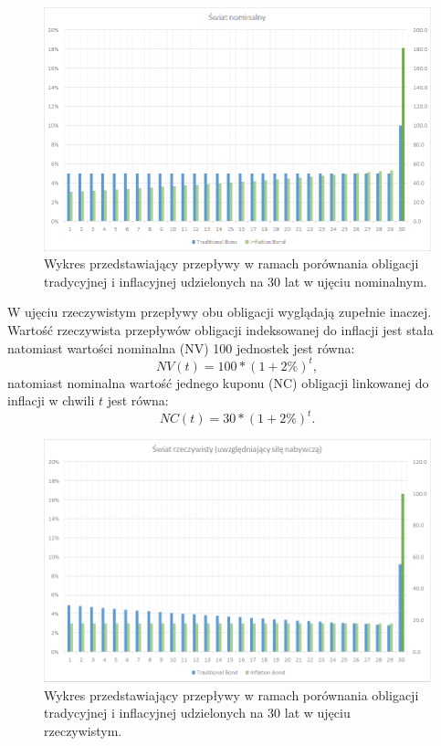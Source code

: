 \documentclass{mini}
\theoremstyle{mythstyle}
\begin{document}
		\begin{figure} [h]
		\centering
		\includegraphics[scale=0.7]{graphics/nominalworld.png}
		\caption{Wykres przedstawiający przepływy w ramach porównania obligacji tradycyjnej i inflacyjnej udzielonych na 30 lat w ujęciu nominalnym.}
	\end{figure}
	W ujęciu rzeczywistym przepływy obu obligacji wyglądają zupełnie inaczej. Wartość rzeczywista przepływów obligacji indeksowanej do inflacji jest stała natomiast wartości nominalna (NV) 100 jednostek jest równa:
		\begin{equation*}
	NV(t) = 100 * (1+2\%)^t,
	\end{equation*}
	natomiast nominalna wartość jednego kuponu (NC) obligacji linkowanej do inflacji w chwili $t$ jest równa:
	\begin{equation*}
	NC(t) = 30 * (1+2\%)^t.
	\end{equation*}
	\begin{figure} [h]
	\centering
	\includegraphics[scale=0.7]{graphics/realworld.png}
	\caption{Wykres przedstawiający przepływy w ramach porównania obligacji tradycyjnej i inflacyjnej udzielonych na 30 lat w ujęciu rzeczywistym.}
\end{figure}
	
\end{document}
